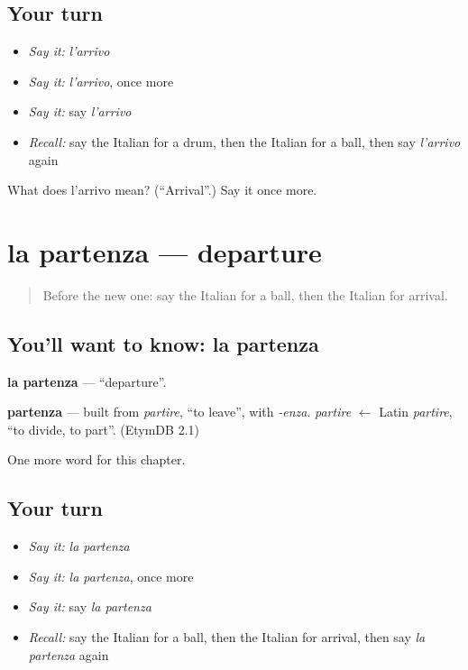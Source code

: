 \subsection*{Your turn}
\begin{itemize}
\raggedright
  \item \emph{Say it:} \emph{l'arrivo}
  \item \emph{Say it:} \emph{l'arrivo}, once more
  \item \emph{Say it:} say \emph{l'arrivo}
  \item \emph{Recall:} say the Italian for a drum, then the Italian for a ball, then say \emph{l'arrivo} again
\end{itemize}

\begin{tcolorbox}[breakable,colback=teal!4,colframe=teal!35!black,title={Before you move on}]
What does l'arrivo mean? (\textquotedblleft{}Arrival\textquotedblright{}.) Say it once more.
\end{tcolorbox}
\section[la partenza]{la partenza — departure}

\label{lesson:IT-C171-partenza}



\begin{quote}
Before the new one: say the Italian for a ball, then the Italian for arrival.
\end{quote}

\subsection*{You'll want to know: la partenza}
\textbf{la partenza} — \textquotedblleft{}departure\textquotedblright{}.

\begin{cousinweb}
\textbf{partenza} — built from \emph{partire}, \textquotedblleft{}to leave\textquotedblright{}, with \emph{-enza}. \emph{partire} $\leftarrow$ Latin \emph{partire}, \textquotedblleft{}to divide, to part\textquotedblright{}. (EtymDB 2.1)
\end{cousinweb}

\begin{grammarlens}[title={What you've built}]
One more word for this chapter.
\end{grammarlens}

\subsection*{Your turn}
\begin{itemize}
\raggedright
  \item \emph{Say it:} \emph{la partenza}
  \item \emph{Say it:} \emph{la partenza}, once more
  \item \emph{Say it:} say \emph{la partenza}
  \item \emph{Recall:} say the Italian for a ball, then the Italian for arrival, then say \emph{la partenza} again
\end{itemize}

